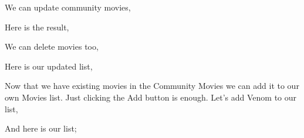 \documentclass[letterpaper,10pt,english]{sphinxmanual}
\begin{document}
We can update community movies,
\begin{quote}

\begin{figure}[htbp]
\centering

\noindent{}
\end{figure}
\end{quote}

Here is the result,
\begin{quote}

\begin{figure}[htbp]
\centering

\noindent{}
\end{figure}
\end{quote}

We can delete movies too,
\begin{quote}

\begin{figure}[htbp]
\centering

\noindent{}
\end{figure}
\end{quote}

Here is our updated list,
\begin{quote}

\begin{figure}[htbp]
\centering

\noindent{}
\end{figure}
\end{quote}

Now that we have existing movies in the Community Movies we can add it to our own Movies list.
Just clicking the Add button is enough. Let’s add Venom to our list,
\begin{quote}

\begin{figure}[htbp]
\centering

\noindent{}
\end{figure}
\end{quote}

And here is our list;
\begin{quote}

\begin{figure}[htbp]
\centering

\noindent{}
\end{figure}
\end{quote}
\end{document}
